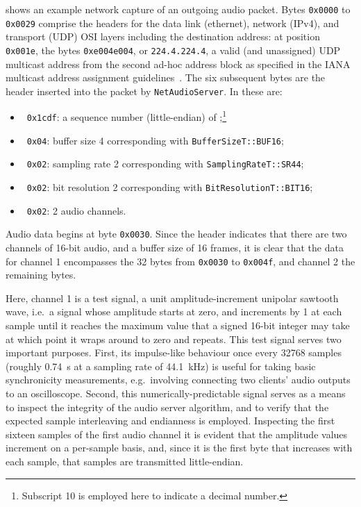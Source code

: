  shows an example network capture of an outgoing
audio packet.
Bytes \texttt{0x0000} to \texttt{0x0029} comprise the headers for the data link
(ethernet), network (IPv4), and transport (UDP) OSI layers including the
destination address: at position \texttt{0x001e}, the bytes \texttt{0xe004e004},
or \texttt{224.4.224.4}, a valid (and unassigned) UDP multicast address from the
second ad-hoc address block as specified in the IANA multicast address
assignment guidelines~\citep{meyer_iana_2010}.
The six subsequent bytes are the header inserted into the packet by
\texttt{NetAudioServer}.
In  these are:
\begin{itemize}
    \item~\texttt{0x1cdf}: a sequence number (little-endian) of
    ;\footnote{Subscript 10 is employed here to indicate a decimal
    number.}
    \item~\texttt{0x04}: buffer size \num{4} corresponding with
    \texttt{BufferSizeT::BUF16};
    \item~\texttt{0x02}: sampling rate \num{2} corresponding with
    \texttt{SamplingRateT::SR44};
    \item~\texttt{0x02}: bit resolution \num{2} corresponding with
    \texttt{BitResolutionT::BIT16};
    \item~\texttt{0x02}: \num{2} audio channels.
\end{itemize}

Audio data begins at byte \texttt{0x0030}.
Since the header indicates that there are two channels of 16-bit audio, and a
buffer size of 16 frames, it is clear that the data for channel 1 encompasses
the 32 bytes from \texttt{0x0030} to \texttt{0x004f}, and channel 2 the
remaining bytes.

Here, channel 1 is a test signal, a unit amplitude-increment unipolar sawtooth
wave, i.e.\ a signal whose amplitude starts at zero, and increments by 1 at each
sample until it reaches the maximum value that a signed 16-bit integer may take
\textemdash{}  \textemdash{} at which point it wraps around to
zero and repeats.
This test signal serves two important purposes.
First, its impulse-like behaviour once every \num{32768} samples (roughly
\qty{.74}{\s} at a sampling rate of \qty{44.1}{\kHz}) is useful for taking basic
synchronicity measurements, e.g.\ involving connecting two clients' audio
outputs to an oscilloscope.
Second, this numerically-predictable signal serves as a means to inspect the
integrity of the audio server algorithm, and to verify that the expected
sample interleaving and endianness is employed.
Inspecting the first sixteen samples of the first audio channel
it is evident that the amplitude values increment on a per-sample basis, and,
since it is the first byte that increases with each sample, that samples are
transmitted little-endian.

